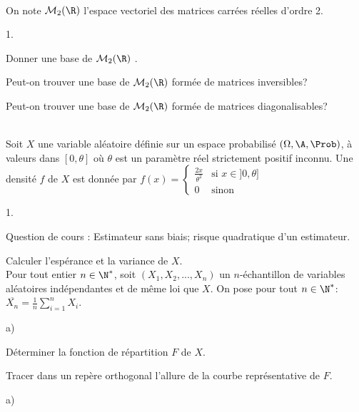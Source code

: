 \documentclass[11pt]{article}%
\begin{document}
\begin{exerciceSP}~\\
  On note $\mathcal{M}_2(\R)$ l'espace vectoriel des matrices carrées
  réelles d'ordre 2.
  \begin{noliste}{1.}
    \setlength{\itemsep}{2mm}
  \item Donner une base de $\mathcal{M}_2(\R)$ .
  \item Peut-on trouver une base de $\mathcal{M}_2(\R)$ formée de
    matrices inversibles?
  \item Peut-on trouver une base de $\mathcal{M}_2(\R)$ formée de
    matrices diagonalisables?
  \end{noliste}
\end{exerciceSP}


\newpage


\begin{exerciceAP}~\\
  Soit $X$ une variable aléatoire définie sur un espace probabilisé
  $(\Omega, \A, \Prob)$, à valeurs dans $[0, \theta]$ où
  $\theta$ est un paramètre réel strictement positif inconnu. Une
  densité $f$ de $X$ est donnée par $f(x)= \left\{\begin{array}{lr}
      \frac{2x}{\theta^2} & \text{si } x \in ]0, \theta] \\ 0 &
      \text{sinon}
    \end{array} \right.$
  \begin{noliste}{1.}
    \setlength{\itemsep}{2mm}
  \item Question de cours : Estimateur sans biais; risque quadratique
    d'un estimateur.
  \item Calculer l'espérance et la variance de $X$.\\ 
    Pour tout entier $n \in \N^*$, soit $(X_1,X_2,...,X_n)$ un
    $n$-échantillon de variables aléatoires indépendantes et de même
    loi que $X$. On pose pour tout $n \in \N^*$: $\overline{X_n}=
    \frac{1}{n} \sum \limits_{i=1}^n X_i$. \\ 
  \item \begin{noliste}{a)}
    \setlength{\itemsep}{2mm}
    \item Déterminer la fonction de répartition $F$ de $X$.
    \item Tracer dans un repère orthogonal l'allure de la courbe
      représentative de $F$.
    \end{noliste}
  \item \begin{noliste}{a)}

\end{noliste}
\end{noliste}
\end{exerciceAP}
\end{document}
